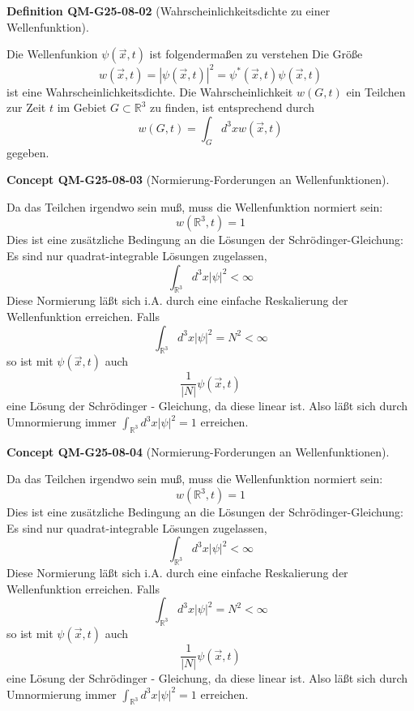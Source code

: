 \documentclass[10pt, letterpaper]{article}
\newcommand{\CustomHeading}[3]{%
  \par\medskip\noindent%
  \textbf{#1 #2} \textnormal{(#3)}.\enskip%
}
\newenvironment{DEF}[2]{\CustomHeading{Definition}{#1}{#2}}{}
\newenvironment{CONC}[2]{\CustomHeading{Concept}{#1}{#2}}{}
\begin{document}
\begin{DEF}{QM-G25-08-02}{Wahrscheinlichkeitsdichte zu einer Wellenfunktion}
Die Wellenfunkion $\psi(\vec{x}, t)$ ist folgendermaßen zu verstehen
Die Größe
$$
w(\vec{x}, t)=|\psi(\vec{x}, t)|^{2}=\psi^{*}(\vec{x}, t) \psi(\vec{x}, t)
$$
ist eine Wahrscheinlichkeitsdichte. Die Wahrscheinlichkeit $w(G, t)$ ein Teilchen zur Zeit $t$ im Gebiet $G \subset \mathbb{R}^{3}$ zu finden, ist entsprechend durch
$$
w(G, t)=\int_{G} d^{3} x w(\vec{x}, t)
$$
gegeben.
\end{DEF}

\begin{CONC}{QM-G25-08-03}{Normierung-Forderungen an Wellenfunktionen}
Da das Teilchen irgendwo sein muß, muss die Wellenfunktion normiert sein:
$$
w\left(\mathbb{R}^{3}, t\right)=1
$$
Dies ist eine zusätzliche Bedingung an die Lösungen der Schrödinger-Gleichung: Es sind nur quadrat-integrable Lösungen zugelassen,
$$
\int_{\mathbb{R}^{3}} d^{3} x|\psi|^{2}<\infty
$$
Diese Normierung läßt sich i.A. durch eine einfache Reskalierung der Wellenfunktion erreichen. Falls
$$
\int_{\mathbb{R}^{3}} d^{3} x|\psi|^{2}=N^{2}<\infty
$$
so ist mit $\psi(\vec{x}, t)$ auch
$$
\frac{1}{|N|} \psi(\vec{x}, t)
$$
eine Lösung der Schrödinger - Gleichung, da diese linear ist. Also läßt sich durch Umnormierung immer $\int_{\mathbb{R}^{3}} d^{3} x|\psi|^{2}=1$ erreichen.
\end{CONC}

\begin{CONC}{QM-G25-08-04}{Normierung-Forderungen an Wellenfunktionen}
Da das Teilchen irgendwo sein muß, muss die Wellenfunktion normiert sein:
$$
w\left(\mathbb{R}^{3}, t\right)=1
$$
Dies ist eine zusätzliche Bedingung an die Lösungen der Schrödinger-Gleichung: Es sind nur quadrat-integrable Lösungen zugelassen,
$$
\int_{\mathbb{R}^{3}} d^{3} x|\psi|^{2}<\infty
$$
Diese Normierung läßt sich i.A. durch eine einfache Reskalierung der Wellenfunktion erreichen. Falls
$$
\int_{\mathbb{R}^{3}} d^{3} x|\psi|^{2}=N^{2}<\infty
$$
so ist mit $\psi(\vec{x}, t)$ auch
$$
\frac{1}{|N|} \psi(\vec{x}, t)
$$
eine Lösung der Schrödinger - Gleichung, da diese linear ist. Also läßt sich durch Umnormierung immer $\int_{\mathbb{R}^{3}} d^{3} x|\psi|^{2}=1$ erreichen.
\end{CONC}
\end{document}
